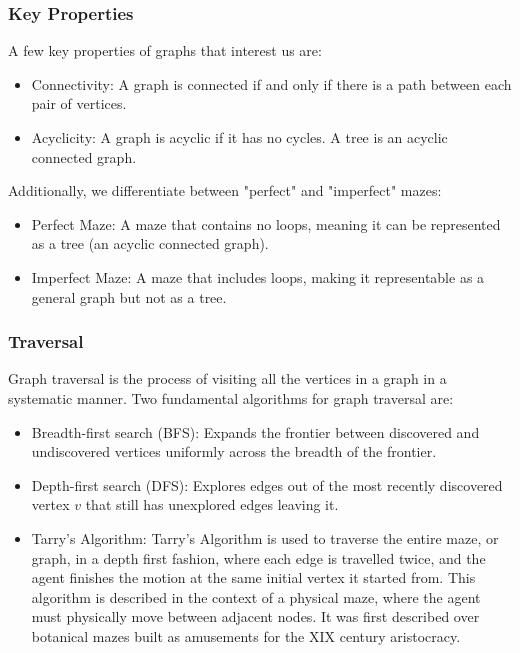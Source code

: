 \subsubsection{Key Properties}

A few key properties of graphs that interest us are:

\begin{itemize}
    \item Connectivity: A graph is connected if and only if there is a path between each pair of vertices. \cite{West2018}
    \item Acyclicity: A graph is acyclic if it has no cycles. A tree is an acyclic connected graph.
\end{itemize}

Additionally, we differentiate between "perfect" and "imperfect" mazes:

\begin{itemize}
    \item Perfect Maze: A maze that contains no loops, meaning it can be represented as a tree (an acyclic connected graph). 
    \item Imperfect Maze: A maze that includes loops, making it representable as a general graph but not as a tree. 
\end{itemize}

\subsubsection{Traversal}

Graph traversal is the process of visiting all the vertices in a graph in a systematic manner. Two fundamental algorithms for graph traversal are:

\begin{itemize}
    \item Breadth-first search (BFS): Expands the frontier between discovered and undiscovered vertices uniformly across the breadth of the frontier. \cite{Manber1989}
    \item Depth-first search (DFS): Explores edges out of the most recently discovered vertex $v$ that still has unexplored edges leaving it. \cite{Manber1989}
    \item Tarry's Algorithm: Tarry's Algorithm is used to traverse the entire maze, or graph, in a depth first fashion, where each edge is travelled twice, and the agent finishes the motion at the same initial vertex it started from.\cite{Kivelevitch2010} This algorithm is described in the context of a physical maze, where the agent must physically move between adjacent nodes.
    It was first described over botanical mazes built as amusements for the XIX century aristocracy.
\end{itemize}

